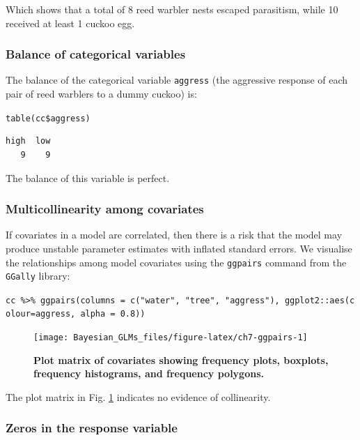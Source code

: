 \documentclass[
]{book}
\begin{document}
Which shows that a total of 8 reed warbler nests escaped parasitism, while 10 received at least 1 cuckoo egg.

\hypertarget{bern-balance}{%
\subsubsection{Balance of categorical variables}\label{bern-balance}}

The balance of the categorical variable \texttt{aggress} (the aggressive response of each pair of reed warblers to a dummy cuckoo) is:

\texttt{table(cc\$aggress)}

\begin{verbatim}
high  low 
   9    9 
\end{verbatim}

The balance of this variable is perfect.

\hypertarget{bern-collin}{%
\subsubsection{Multicollinearity among covariates}\label{bern-collin}}

If covariates in a model are correlated, then there is a risk that the model may produce unstable parameter estimates with inflated standard errors. We visualise the relationships among model covariates using the \texttt{ggpairs} command from the \texttt{GGally} library:

\texttt{cc\ \%\textgreater{}\%\ ggpairs(columns\ =\ c("water",\ "tree",\ "aggress"),\ ggplot2::aes(colour=aggress,\ alpha\ =\ 0.8))}



\begin{figure}

{\centering \texttt{[image: Bayesian\_GLMs\_files/figure-latex/ch7-ggpairs-1]} 

}

\caption{\textbf{Plot matrix of covariates showing frequency plots, boxplots, frequency histograms, and frequency polygons.}}\label{fig:ch7-ggpairs}
\end{figure}

The plot matrix in Fig. \ref{fig:ch7-ggpairs} indicates no evidence of collinearity.

\hypertarget{bern-zeros}{%
\subsubsection{Zeros in the response variable}\label{bern-zeros}}
\end{document}
